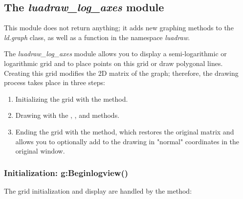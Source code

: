 \subsection{The \emph{luadraw\_log\_axes} module}

This module does not return anything; it adds new graphing methods to the \emph{ld.graph} class, as well as a function in the namespace \emph{luadraw}.

The \emph{luadraw\_log\_axes} module allows you to display a semi-logarithmic or logarithmic grid and to place points on this grid or draw polygonal lines. Creating this grid modifies the 2D matrix of the graph; therefore, the drawing process takes place in three steps:

\begin{enumerate}
    \item Initializing the grid with the  method.
    \item Drawing with the , ,  and  methods.
    \item Ending the grid with the  method, which restores the original matrix and allows you to optionally add to the drawing in "normal" coordinates in the original window.
\end{enumerate}

\subsubsection{Initialization: g:Beginlogview()}

The grid initialization and display are handled by the method:

